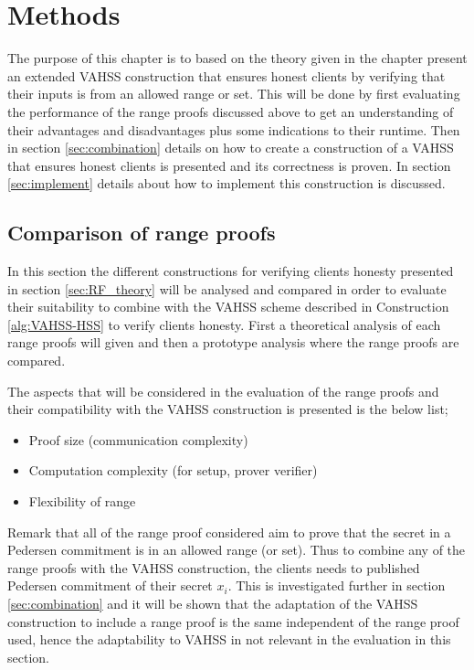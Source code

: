 \chapter{Methods}
\label{ch:Methods}

The purpose of this chapter is to based on the theory given in the chapter present an extended VAHSS construction that ensures honest clients by verifying that their inputs is from an allowed range or set. This will be done by first evaluating the performance of the range proofs discussed above to get an understanding of their advantages and disadvantages plus some indications to their runtime. Then in section \ref{sec:combination} details on how to create a construction of a VAHSS that ensures honest clients is presented and its correctness is proven. In section \ref{sec:implement} details about how to implement this construction is discussed. 

\section{Comparison of range proofs}
In this section the different constructions for verifying clients honesty presented in section \ref{sec:RF_theory} will be analysed and compared in order to evaluate  their suitability to combine with the VAHSS scheme described in Construction \ref{alg:VAHSS-HSS} to verify clients honesty. First a theoretical analysis of each range proofs will given and then a prototype analysis where the range proofs are compared.  

The aspects that will be considered in the evaluation of the range proofs and their compatibility with the VAHSS construction is presented is the below list;
\begin{itemize}
    \item Proof size (communication complexity)
    \item Computation complexity  (for setup, prover verifier)
    \item Flexibility of range
\end{itemize}

Remark that all of the range proof considered aim to prove that the secret in a Pedersen commitment is in an allowed range (or set). Thus to combine any of the range proofs with the VAHSS construction, the clients needs to published Pedersen commitment of their secret $x_i$. This is investigated further in section \ref{sec:combination} and it will be shown that the adaptation of the VAHSS construction to include a range proof is the same independent of the range proof used, hence the adaptability to VAHSS in not relevant in the evaluation in this section.

